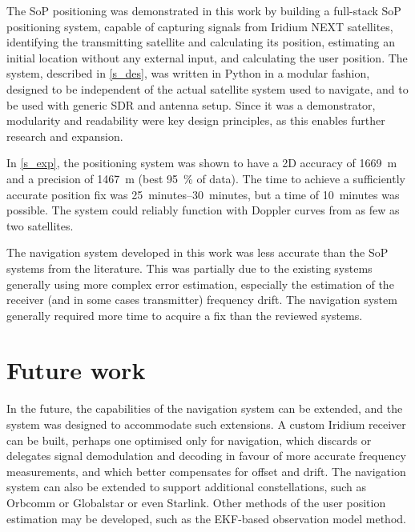 The SoP positioning was demonstrated in this work by building a full-stack SoP positioning system, capable of capturing signals from Iridium NEXT satellites, identifying the transmitting satellite and calculating its position, estimating an initial location without any external input, and calculating the user position. The system, described in \autoref{s_des}, was written in Python in a modular fashion, designed to be independent of the actual satellite system used to navigate, and to be used with generic SDR and antenna setup. Since it was a demonstrator, modularity and readability were key design principles, as this enables further research and expansion.

In \autoref{s_exp}, the positioning system was shown to have a 2D accuracy of \qty{1669}{m} and a precision of \qty{1467}{m} (best \qty{95}{\percent} of data). The time to achieve a sufficiently accurate position fix was \qtyrange{25}{30}{minutes}, but a time of \qty{10}{minutes} was possible. The system could reliably function with Doppler curves from as few as two satellites. 

The navigation system developed in this work was less accurate than the SoP systems from the literature. This was partially due to the existing systems generally using more complex error estimation, especially the estimation of the receiver (and in some cases transmitter) frequency drift. The navigation system generally required more time to acquire a fix than the reviewed systems.

\section{Future work}
In the future, the capabilities of the navigation system can be extended, and the system was designed to accommodate such extensions. A custom Iridium receiver can be built, perhaps one optimised only for navigation, which discards or delegates signal demodulation and decoding in favour of more accurate frequency measurements, and which better compensates for offset and drift. The navigation system can also be extended to support additional constellations, such as Orbcomm or Globalstar or even Starlink. Other methods of the user position estimation may be developed, such as the EKF-based observation model method.

